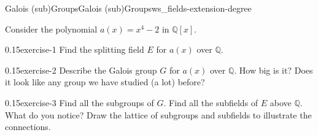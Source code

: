 \documentclass[oneside,11pt,]{article}
\title{}
\date{}
\newcommand{\Q}{\mathbb{Q}}
\begin{document}
%
%
\typeout{************************************************}
\typeout{************************************************}
%
\begin{worksheet-section-numberless}{Galois (sub)Groups}{}{Galois (sub)Groups}{}{}{ws_fields-extension-degree}
\begin{introduction}{}%
\hypertarget{p-1}{}%
Consider the polynomial \(a(x) = x^4 - 2\) in \(\Q[x]\).%
\end{introduction}%
\begin{divisionexercise}{1}{}{0.15}{exercise-1}%
\hypertarget{p-2}{}%
Find the splitting field \(E\) for \(a(x)\) over \(\Q\).%
\end{divisionexercise}%
\begin{divisionexercise}{2}{}{0.15}{exercise-2}%
\hypertarget{p-3}{}%
Describe the Galois group \(G\) for \(a(x)\) over \(\Q\).  How big is it?  Does it look like any group we have studied (a lot) before?%
\end{divisionexercise}%
\begin{divisionexercise}{3}{}{0.15}{exercise-3}%
\hypertarget{p-4}{}%
Find all the subgroups of \(G\).  Find all the subfields of \(E\) above \(\Q\).  What do you notice?  Draw the lattice of subgroups and subfields to illustrate the connections.%
\end{divisionexercise}%
\end{worksheet-section-numberless}
\restoregeometry
\end{document}
